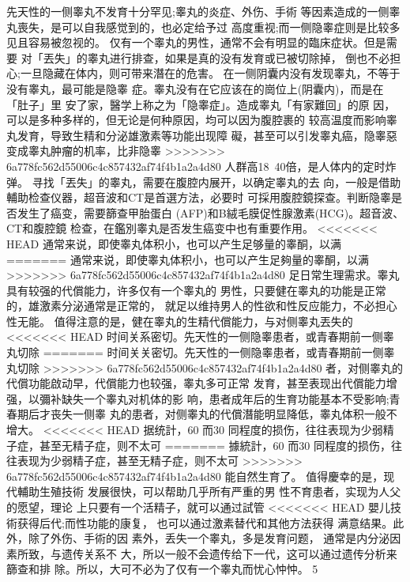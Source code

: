 \documentclass[12pt,UTF8]{ctexbook}
\begin{document}
先天性的一侧睾丸不发育十分罕见;睾丸的炎症、外伤、手術
等因素造成的一侧睾丸喪失，是可以自我感觉到的，也必定给予过
高度重视;而一侧隐睾症则是比较多见且容易被忽视的。
仅有一个睾丸的男性，通常不会有明显的臨床症状。但是需要
对「丟失」的睾丸进行排查，如果是真的没有发育或已被切除掉，
倒也不必担心;一旦隐藏在体内，则可带来潛在的危害。
在一侧阴囊内没有发现睾丸，不等于没有睾丸，最可能是隐睾
症。睾丸没有在它应该在的崗位上(阴囊内)，而是在「肚子」里
安了家，醫学上称之为「隐睾症」。造成睾丸「有家難回」的原
因，可以是多种多样的，但无论是何种原因，均可以因为腹腔裹的
较高温度而影响睾丸发育，导致生精和分泌雄激素等功能出现障
礙，甚至可以引发睾丸癌，隐睾惡变成睾丸肿瘤的机率，比非隐睾
>>>>>>> 6a778fc562d55006c4c857432af74f4b1a2a4d80
人群高18~40倍，是人体内的定时炸弹。
寻找「丟失」的睾丸，需要在腹腔内展开，以确定睾丸的去
向，一般是借助輔助检查仪器，超音波和CT是首選方法，必要时
可採用腹腔鏡探查。判断隐睾是否发生了癌变，需要篩查甲胎蛋白
(AFP)和B絨毛膜促性腺激素(HCG)。超音波、CT和腹腔鏡
检查，在鑑別睾丸是否发生癌变中也有重要作用。
<<<<<<< HEAD
通常来说，即使睾丸体积小，也可以产生足够量的睾酮，以满
=======
通常来说，即使睾丸体积小，也可以产生足夠量的睾酮，以满
>>>>>>> 6a778fc562d55006c4c857432af74f4b1a2a4d80
足日常生理需求。睾丸具有较强的代償能力，许多仅有一个睾丸的
男性，只要健在睾丸的功能是正常的，雄激素分泌通常是正常的，
就足以维持男人的性欲和性反应能力，不必担心性无能。
值得注意的是，健在睾丸的生精代償能力，与对侧睾丸丟失的
<<<<<<< HEAD
时间关系密切。先天性的一侧隐睾患者，或青春期前一侧睾丸切除
=======
时间关关密切。先天性的一侧隐睾患者，或青春期前一侧睾丸切除
>>>>>>> 6a778fc562d55006c4c857432af74f4b1a2a4d80
者，对侧睾丸的代償功能啟动早，代償能力也较强，睾丸多可正常
发育，甚至表现出代償能力增强，以彌补缺失一个睾丸对机体的影
响，患者成年后的生育功能基本不受影响;青春期后才丧失一侧睾
丸的患者，对侧睾丸的代償潛能明显降低，睾丸体积一般不增大。
<<<<<<< HEAD
据统計，60%
而30%
同程度的损伤，往往表现为少弱精子症，甚至无精子症，则不太可
=======
據統計，60%
而30%
同程度的损伤，往往表现为少弱精子症，甚至无精子症，则不太可
>>>>>>> 6a778fc562d55006c4c857432af74f4b1a2a4d80
能自然生育了。
值得慶幸的是，现代輔助生殖技術
发展很快，可以帮助几乎所有严重的男
性不育患者，实现为人父的愿望，理论
上只要有一个活精子，就可以通过試管
<<<<<<< HEAD
嬰儿技術获得后代;而性功能的康复，
也可以通过激素替代和其他方法获得
满意结果。此外，除了外伤、手術的因
素外，丢失一个睾丸，多是发育问题，
通常是内分泌因素所致，与遗传关系不
大，所以一般不会遗传给下一代，这可以通过遗传分析来篩查和排
除。所以，大可不必为了仅有一个睾丸而忧心忡忡。
5
\end{document}
